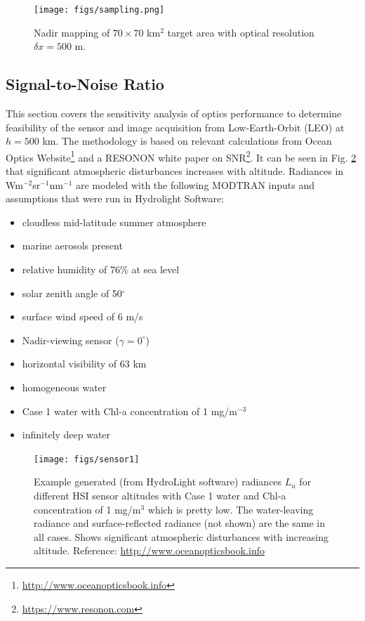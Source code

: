 \begin{figure}[htbp]
  \centering
      \texttt{[image: figs/sampling.png]}
  \caption{Nadir mapping of $70 \times 70$ km$^{2}$ target area with optical resolution $\delta x = 500$ m.}
	\label{fig:sampling}
\end{figure}

\subsection{Signal-to-Noise Ratio} \label{sec:snr}
This section covers the sensitivity analysis of optics performance to determine feasibility of the sensor and image acquisition from Low-Earth-Orbit (LEO) at $h=500$ km. The methodology is based on relevant calculations from Ocean Optics Website\footnote{\url{http://www.oceanopticsbook.info}} and a RESONON white paper on SNR\footnote{\url{https://www.resonon.com}}. It can be seen in Fig. \ref{fig:sensor1} that significant atmospheric disturbances increases with altitude. Radiances in Wm$^{-2}$sr$^{-1}$nm$^{-1}$ are modeled with the following MODTRAN inputs and assumptions that were run in Hydrolight Software: 
\begin{itemize}
\item cloudless mid-latitude summer atmosphere
\item marine aerosols present
\item relative humidity of 76$\%$ at sea level
\item solar zenith angle of 50$^{\circ}$
\item surface wind speed of $ 6$ m/s
\item Nadir-viewing sensor ($\gamma=0^{\circ}$)
\item horizontal visibility of $63$ km
\item homogeneous water
\item Case 1 water with Chl-a concentration of 1 mg/m$^{-3}$
\item infinitely deep water
\end{itemize} 

\begin{figure}[htbp]
  \centering
      \texttt{[image: figs/sensor1]}
  \caption{Example generated (from HydroLight software) radiances $L_u$ for different HSI sensor altitudes with Case 1 water and Chl-a concentration of 1 mg/m$^3$ which is pretty low. The water-leaving radiance and surface-reflected radiance (not shown) are the same in all cases. Shows significant atmospheric disturbances with increasing altitude. Reference: \url{http://www.oceanopticsbook.info}}
	\label{fig:sensor1}
\end{figure}


